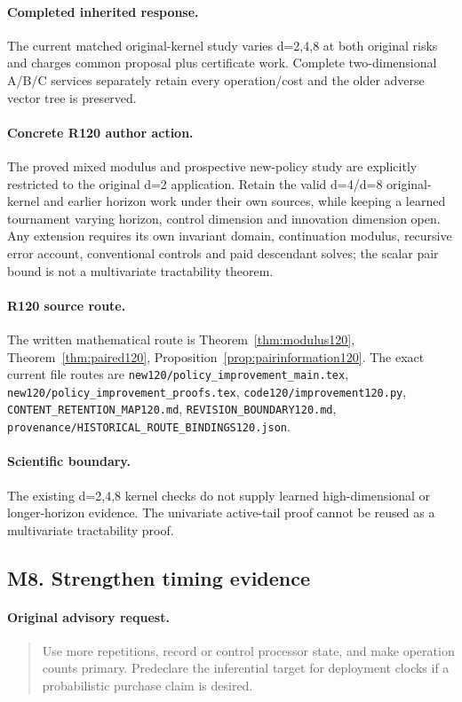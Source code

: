 \paragraph{Completed inherited response.}
The current matched original-kernel study varies d=2,4,8 at both original risks and charges common proposal plus certificate work. Complete two-dimensional A/B/C services separately retain every operation/cost and the older adverse vector tree is preserved.
\paragraph{Concrete R120 author action.}
The proved mixed modulus and prospective new-policy study are explicitly restricted to the original d=2 application. Retain the valid d=4/d=8 original-kernel and earlier horizon work under their own sources, while keeping a learned tournament varying horizon, control dimension and innovation dimension open. Any extension requires its own invariant domain, continuation modulus, recursive error account, conventional controls and paid descendant solves; the scalar pair bound is not a multivariate tractability theorem.
\paragraph{R120 source route.}
The written mathematical route is Theorem~\ref{thm:modulus120}, Theorem~\ref{thm:paired120}, Proposition~\ref{prop:pairinformation120}. The exact current file routes are \nolinkurl{new120/policy_improvement_main.tex}, \nolinkurl{new120/policy_improvement_proofs.tex}, \nolinkurl{code120/improvement120.py}, \nolinkurl{CONTENT_RETENTION_MAP120.md}, \nolinkurl{REVISION_BOUNDARY120.md}, \nolinkurl{provenance/HISTORICAL_ROUTE_BINDINGS120.json}.
\paragraph{Scientific boundary.}
The existing d=2,4,8 kernel checks do not supply learned high-dimensional or longer-horizon evidence. The univariate active-tail proof cannot be reused as a multivariate tractability proof.

\subsection{M8. Strengthen timing evidence}
\label{response120:M8}
\paragraph{Original advisory request.}
\begin{quote}
Use more repetitions, record or control processor state, and make operation counts primary. Predeclare the inferential target for deployment clocks if a probabilistic purchase claim is desired.
\end{quote}
